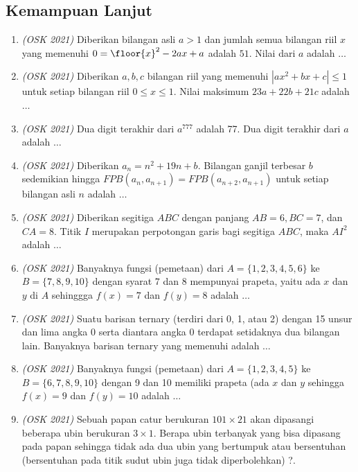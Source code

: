 \subsection{Kemampuan Lanjut}
\begin{enumerate}
	\item \textit{(OSK 2021)} Diberikan bilangan asli $a > 1$ dan jumlah semua bilangan riil $x$ yang memenuhi $0 = \floor{x}^2-2ax+a$  adalah $51$. Nilai dari $a$ adalah $\dots$
	
	\item \textit{(OSK 2021)} Diberikan $a,b,c$ bilangan riil yang memenuhi $|ax^2+bx+c| \leq 1$ untuk setiap bilangan riil $0 \leq x \leq 1$. Nilai maksimum $23a+22b+21c$ adalah $\dots$
	
	\item \textit{(OSK 2021)} Dua digit terakhir dari $a^{777}$ adalah 77. Dua digit terakhir dari $a$ adalah $\dots$
	
	\item \textit{(OSK 2021)} Diberikan $a_n = n^2+19n+b$. Bilangan ganjil terbesar $b$ sedemikian hingga $FPB(a_n,a_{n+1}) = FPB(a_{n+2},a_{n+1})$ untuk setiap bilangan asli $n$ adalah $\dots$
	
	\item \textit{(OSK 2021)} Diberikan segitiga $ABC$ dengan panjang $AB = 6, BC = 7$, dan $CA = 8$. Titik $I$ merupakan perpotongan garis bagi segitiga $ABC$, maka $AI^2$ adalah $\dots$
	
	\item \textit{(OSK 2021)} Banyaknya fungsi (pemetaan) dari $A=\{1,2,3,4,5,6\}$ ke $B=\{7,8,9,10\}$ dengan syarat $7$ dan $8$ mempunyai prapeta, yaitu ada $x$ dan $y$ di $A$ sehinggga $f(x)=7$ dan $f(y)=8$ adalah $\dots$
	
	\item \textit{(OSK 2021)} Suatu barisan ternary (terdiri dari 0, 1, atau 2) dengan 15 unsur dan lima angka 0 serta diantara angka 0 terdapat setidaknya dua bilangan lain. Banyaknya barisan ternary yang memenuhi adalah $\dots$
	
	\item \textit{(OSK 2021)} Banyaknya fungsi (pemetaan) dari $A = \{1,2,3,4,5\}$ ke  $B = \{6,7,8,9,10\}$ dengan 9 dan 10 memiliki prapeta (ada $x$ dan $y$ sehingga $f(x) = 9$ dan $f(y) = 10$ adalah $\dots$
	
	\item \textit{(OSK 2021)} Sebuah papan catur berukuran $101 \times 21$ akan dipasangi beberapa ubin berukuran $3 \times 1$. Berapa ubin terbanyak yang bisa dipasang pada papan sehingga tidak ada dua ubin yang bertumpuk atau bersentuhan (bersentuhan pada titik sudut ubin juga tidak diperbolehkan) ?.
	

\end{enumerate}
